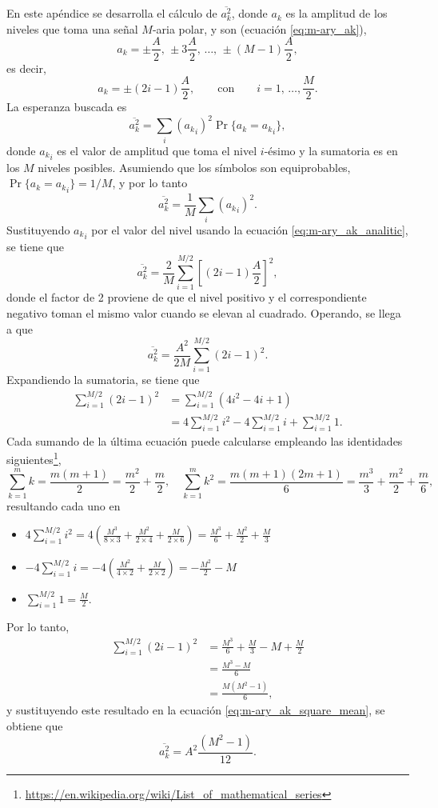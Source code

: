 \documentclass[a4paper]{article}
\begin{document}
En este apéndice se desarrolla el cálculo de \(\overline{a_k^2}\), donde \(a_k\) es la amplitud de los niveles que toma una señal \(M\)-aria polar, y son (ecuación \ref{eq:m-ary_ak}),
\[
 a_k=\pm \frac{A}{2},\,\pm 3\frac{A}{2},\,\dots,\,\pm (M-1)\frac{A}{2},
\]
es decir,
\begin{equation}\label{eq:m-ary_ak_analitic}
 a_k=\pm(2i-1)\frac{A}{2},\qquad\textrm{con}\qquad i=1,\,\dots,\frac{M}{2}.
\end{equation}
La esperanza buscada es
\[
 \overline{a_k^2}=\sum_i\left({a_k}_i\right)^2\Pr\lbrace a_k={a_k}_i\rbrace,
\]
donde \({a_k}_i\) es el valor de amplitud que toma el nivel \(i\)-ésimo y la sumatoria es en los \(M\) niveles posibles. Asumiendo que los símbolos son equiprobables, \(\Pr\lbrace a_k={a_k}_i\rbrace=1/M\), y por lo tanto
\[
 \overline{a_k^2}=\frac{1}{M}\sum_i\left({a_k}_i\right)^2.
\]
Sustituyendo \({a_k}_i\) por el valor del nivel usando la ecuación \ref{eq:m-ary_ak_analitic}, se tiene que
\[
 \overline{a_k^2}=\frac{2}{M}\sum_{i=1}^{M/2}\left[(2i-1)\frac{A}{2}\right]^2,
\]
donde el factor de 2 proviene de que el nivel positivo y el correspondiente negativo toman el mismo valor cuando se elevan al cuadrado. Operando, se llega a que
\begin{equation}\label{eq:m-ary_ak_square_mean}
 \overline{a_k^2}=\frac{A^2}{2M}\sum_{i=1}^{M/2}(2i-1)^2.
\end{equation}
Expandiendo la sumatoria, se tiene que
\begin{align*}
 \sum_{i=1}^{M/2}(2i-1)^2&=\sum_{i=1}^{M/2}\left(4i^2-4i+1\right)\\
   &=4\sum_{i=1}^{M/2}i^2-4\sum_{i=1}^{M/2}i+\sum_{i=1}^{M/2}1.
\end{align*}
Cada sumando de la última ecuación puede calcularse empleando las identidades siguientes\footnote{\url{https://en.wikipedia.org/wiki/List_of_mathematical_series}},
\[
 \sum _{k=1}^{m}k={\frac {m(m+1)}{2}}=\frac{m^2}{2}+\frac{m}{2},\quad 
 \sum _{k=1}^{m}k^{2}={\frac {m(m+1)(2m+1)}{6}}={\frac {m^{3}}{3}}+{\frac {m^{2}}{2}}+{\frac {m}{6}},
\]
resultando cada uno en
\begin{itemize}
 \item \(\displaystyle 4\sum_{i=1}^{M/2}i^2=4\left(\frac{M^3}{8\times3}+\frac{M^2}{2\times4}+\frac{M}{2\times6}\right)=\frac{M^3}{6}+\frac{M^2}{2}+\frac{M}{3}\)
 \item \(\displaystyle -4\sum_{i=1}^{M/2}i=-4\left(\frac{M^2}{4\times2}+\frac{M}{2\times2}\right)=-\frac{M^2}{2}-M\)
 \item \(\displaystyle \sum_{i=1}^{M/2}1=\frac{M}{2}\).
\end{itemize}
Por lo tanto,
\begin{align*}
 \sum_{i=1}^{M/2}(2i-1)^2&=\frac{M^3}{6}+\frac{M}{3}-M+\frac{M}{2}\\
   &=\frac{M^3-M}{6}\\
   &=\frac{M(M^2-1)}{6},
\end{align*}
y sustituyendo este resultado en la ecuación \ref{eq:m-ary_ak_square_mean}, se obtiene que
\[
 \overline{a_k^2}=A^2\frac{(M^2-1)}{12}.
\]
 


\end{document}

